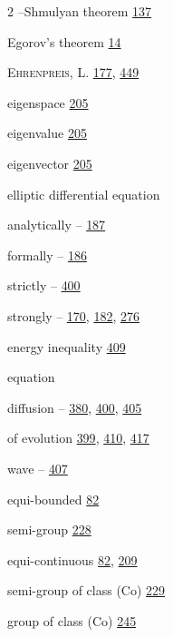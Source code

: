 \begin{multicols}{2}
\hspace*{1.1em}--Shmulyan theorem \hyperlink{page.137}{137}\par
\noindent Egorov's theorem \hyperlink{page.14}{14}\par
\noindent \textsc{Ehrenpreis}, L. \hyperlink{page.177}{177}, \hyperlink{page.449}{449}\par
\noindent eigenspace \hyperlink{page.205}{205}\par
\noindent eigenvalue \hyperlink{page.205}{205}\par
\noindent eigenvector \hyperlink{page.205}{205}\par
\noindent elliptic differential equation\par
\hspace*{1.1em}analytically -- \hyperlink{page.187}{187}\par
\hspace*{1.1em}formally -- \hyperlink{page.186}{186}\par
\hspace*{1.1em}strictly -- \hyperlink{page.400}{400}\par
\hspace*{1.1em}strongly -- \hyperlink{page.170}{170}, \hyperlink{page.182}{182}, \hyperlink{page.276}{276}\par
\noindent energy inequality \hyperlink{page.409}{409}\par
\noindent equation\par
\hspace*{1.1em}diffusion -- \hyperlink{page.380}{380}, \hyperlink{page.400}{400}, \hyperlink{page.405}{405}\par
\hspace*{1.1em}of evolution \hyperlink{page.399}{399}, \hyperlink{page.410}{410}, \hyperlink{page.417}{417}\par
\hspace*{1.1em}wave -- \hyperlink{page.407}{407}\par
\noindent equi-bounded \hyperlink{page.82}{82}\par
\hspace*{1.1em}semi-group \hyperlink{page.228}{228}\par
\noindent equi-continuous \hyperlink{page.82}{82}, \hyperlink{page.209}{209}\par
\hspace*{1.1em}semi-group of class (Co) \hyperlink{page.229}{229}\par
\hspace*{1.1em}group of class (Co) \hyperlink{page.245}{245}\par

\end{multicols}
